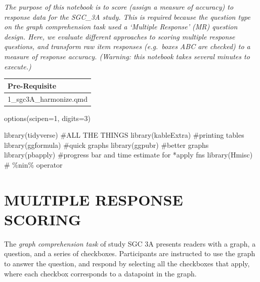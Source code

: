 \documentclass[
  letterpaper,
  DIV=11,
  numbers=noendperiod]{scrreprt}
\newenvironment{Shaded}{\begin{snugshade}}{\end{snugshade}}
\newcommand{\AttributeTok}[1]{\textcolor[rgb]{0.40,0.45,0.13}{#1}}
\newcommand{\CommentTok}[1]{\textcolor[rgb]{0.37,0.37,0.37}{#1}}
\newcommand{\DecValTok}[1]{\textcolor[rgb]{0.68,0.00,0.00}{#1}}
\newcommand{\FunctionTok}[1]{\textcolor[rgb]{0.28,0.35,0.67}{#1}}
\newcommand{\NormalTok}[1]{\textcolor[rgb]{0.00,0.23,0.31}{#1}}
\begin{document}
\emph{The purpose of this notebook is to score (assign a measure of
accuracy) to response data for the SGC\_3A study. This is required
because the question type on the graph comprehension task used a
`Multiple Response' (MR) question design. Here, we evaluate different
approaches to scoring multiple response questions, and transform raw
item responses (e.g.~boxes ABC are checked) to a measure of response
accuracy. (Warning: this notebook takes several minutes to execute.)}

\begin{longtable}[]{@{}l@{}}
\toprule()
Pre-Requisite \\
\midrule()
\endhead
1\_sgc3A\_harmonize.qmd \\
\bottomrule()
\end{longtable}

\begin{Shaded}
\begin{Highlighting}[]
\FunctionTok{options}\NormalTok{(}\AttributeTok{scipen=}\DecValTok{1}\NormalTok{, }\AttributeTok{digits=}\DecValTok{3}\NormalTok{)}

\FunctionTok{library}\NormalTok{(tidyverse) }\CommentTok{\#ALL THE THINGS}
\FunctionTok{library}\NormalTok{(kableExtra) }\CommentTok{\#printing tables }
\FunctionTok{library}\NormalTok{(ggformula) }\CommentTok{\#quick graphs}
\FunctionTok{library}\NormalTok{(ggpubr) }\CommentTok{\#better graphs}
\FunctionTok{library}\NormalTok{(pbapply) }\CommentTok{\#progress bar and time estimate for *apply fns}
\FunctionTok{library}\NormalTok{(Hmisc) }\CommentTok{\# \%nin\% operator}
\end{Highlighting}
\end{Shaded}

\hypertarget{multiple-response-scoring}{%
\section{MULTIPLE RESPONSE SCORING}\label{multiple-response-scoring}}

The \emph{graph comprehension task} of study SGC 3A presents readers
with a graph, a question, and a series of checkboxes. Participants are
instructed to use the graph to answer the question, and respond by
selecting all the checkboxes that apply, where each checkbox corresponds
to a datapoint in the graph.
\end{document}
